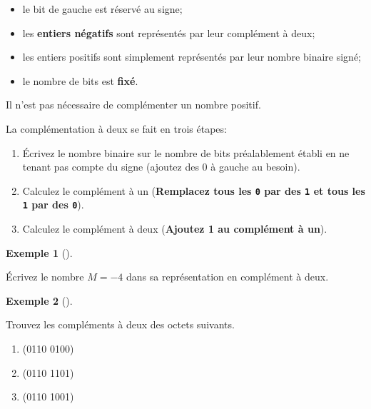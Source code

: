\documentclass[
  letterpaper,
]{scrbook}
\providecommand{\tightlist}{%
  \setlength{\itemsep}{0pt}\setlength{\parskip}{0pt}}\usepackage{longtable,booktabs,array}
\theoremstyle{plain}
\theoremstyle{definition}
\newtheorem{example}{Exemple}[chapter]
\theoremstyle{definition}
\theoremstyle{remark}
\begin{document}
\begin{itemize}
\tightlist
\item
  le bit de gauche est réservé au signe;
\item
  les \textbf{entiers négatifs} sont représentés par leur complément à
  deux;
\item
  les entiers positifs sont simplement représentés par leur nombre
  binaire signé;
\item
  le nombre de bits est \textbf{fixé}.
\end{itemize}

\begin{tcolorbox}[enhanced jigsaw, opacityback=0, rightrule=.15mm, breakable, toprule=.15mm, colbacktitle=quarto-callout-important-color!10!white, title=\textcolor{quarto-callout-important-color}{\faExclamation}\hspace{0.5em}{Important}, titlerule=0mm, arc=.35mm, colback=white, coltitle=black, colframe=quarto-callout-important-color-frame, bottomtitle=1mm, toptitle=1mm, bottomrule=.15mm, leftrule=.75mm, left=2mm, opacitybacktitle=0.6]

Il n'est pas nécessaire de complémenter un nombre positif.

\end{tcolorbox}

La complémentation à deux se fait en trois étapes:

\begin{enumerate}
\def\labelenumi{\arabic{enumi}.}
\tightlist
\item
  Écrivez le nombre binaire sur le nombre de bits préalablement établi
  en ne tenant pas compte du signe (ajoutez des 0 à gauche au besoin).
\item
  Calculez le complément à un (\textbf{Remplacez tous les \texttt{0} par
  des \texttt{1} et tous les \texttt{1} par des \texttt{0}}).
\item
  Calculez le complément à deux (\textbf{Ajoutez 1 au complément à un}).
\end{enumerate}

\leavevmode{}%
\begin{example}[]\label{exm-nombre-moins-4-complement-deux}

Écrivez le nombre \(M=-4\) dans sa représentation en complément à deux.

\end{example}

\leavevmode{}%
\begin{example}[]\label{exm-complement-deux-octets}

Trouvez les compléments à deux des octets suivants.

\begin{enumerate}
\def\labelenumi{\alph{enumi})}
\tightlist
\item
  (0110 0100)
\item
  (0110 1101)
\item
  (0110 1001)
\end{enumerate}

\end{example}
\end{document}
